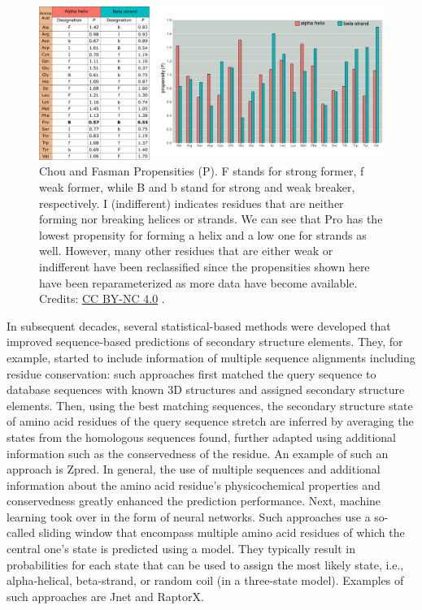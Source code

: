 \begin{figure}[!htbp]
\centering
\includegraphics[width=0.7\linewidth]{files/chou-fasman_alt-585b60b5bbd165c38a90a11a5ba41fcb.pdf}
\caption[]{Chou and Fasman Propensities (P).
F stands for strong former, f weak former, while B and b stand for strong and weak breaker, respectively.
I (indifferent) indicates residues that are neither forming nor breaking helices or strands.
We can see that Pro has the lowest propensity for forming a helix and a low one for strands as well.
However, many other residues that are either weak or indifferent have been reclassified since the propensities shown here have been reparameterized as more data have become available.
Credits: \href{https://creativecommons.org/licenses/by-nc/4.0/}{CC BY-NC 4.0} \cite{own_4_2024}.}
\label{chou_fasman_alt}
\end{figure}

In subsequent decades, several statistical-based methods were developed that improved sequence-based predictions of secondary structure elements.
They, for example, started to include information of multiple sequence alignments including residue conservation: such approaches first matched the query sequence to database sequences with known 3D structures and assigned secondary structure elements.
Then, using the best matching sequences, the secondary structure state of amino acid residues of the query sequence stretch are inferred by averaging the states from the homologous sequences found, further adapted using additional information such as the conservedness of the residue.
An example of such an approach is Zpred.
In general, the use of multiple sequences and additional information about the amino acid residue's physicochemical properties and conservedness greatly enhanced the prediction performance.
Next, machine learning took over in the form of neural networks.
Such approaches use a so-called sliding window that encompass multiple amino acid residues of which the central one's state is predicted using a model.
They typically result in probabilities for each state that can be used to assign the most likely state, i.e., alpha-helical, beta-strand, or random coil (in a three-state model).
Examples of such approaches are Jnet and RaptorX.

